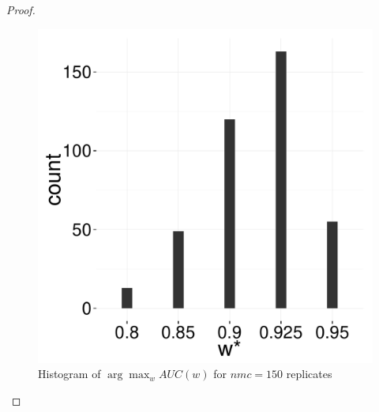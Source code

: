 \documentclass[12pt]{article} %
\begin{document}
\begin{proof}
\begin{figure}[h]
		\includegraphics[scale=0.15]{auc_argmax_hist.pdf}
	
	\caption{Histogram of $\arg\max_w AUC(w)$ for $nmc=150$ replicates}
	\label{fig:ArgMaxWAUCW}
\end{figure}

\end{proof}
\end{document}

